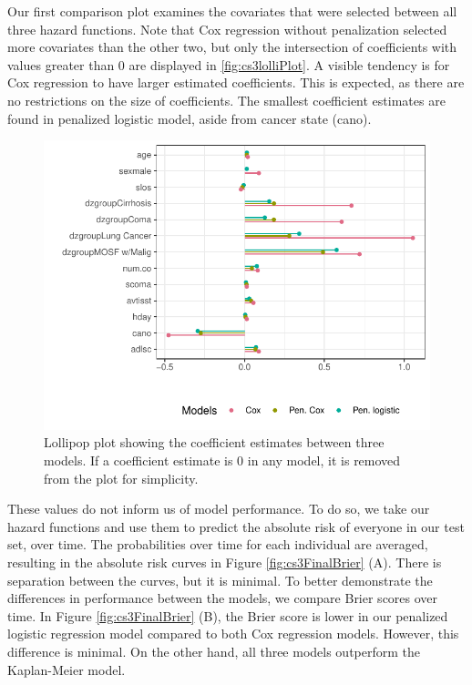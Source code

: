 \documentclass[
]{jss}
\begin{document}
Our first comparison plot examines the covariates that were selected
between all three hazard functions. Note that Cox regression without
penalization selected more covariates than the other two, but only the
intersection of coefficients with values greater than 0 are displayed in
\ref{fig:cs3lolliPlot}. A visible tendency is for Cox regression to have
larger estimated coefficients. This is expected, as there are no
restrictions on the size of coefficients. The smallest coefficient
estimates are found in penalized logistic model, aside from cancer state
(cano).

\begin{CodeChunk}
\begin{figure}

{\centering \includegraphics{../figures/coefplots-1} 

}

\caption{\label{fig:cs3lolliPlot} Lollipop plot showing the coefficient estimates between three models. If a coefficient estimate is 0 in any model, it is removed from the plot for simplicity.}\label{fig:coefplots}
\end{figure}
\end{CodeChunk}

These values do not inform us of model performance. To do so, we take
our hazard functions and use them to predict the absolute risk of
everyone in our test set, over time. The probabilities over time for
each individual are averaged, resulting in the absolute risk curves in
Figure \ref{fig:cs3FinalBrier} (A). There is separation between the
curves, but it is minimal. To better demonstrate the differences in
performance between the models, we compare Brier scores over time. In
Figure \ref{fig:cs3FinalBrier} (B), the Brier score is lower in our
penalized logistic regression model compared to both Cox regression
models. However, this difference is minimal. On the other hand, all
three models outperform the Kaplan-Meier model.
\end{document}
